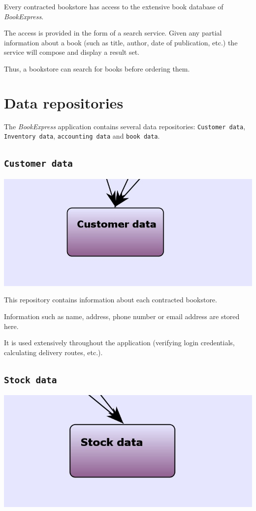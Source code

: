 Every contracted bookstore has access to the extensive book database of \emph{BookExpress}.

The access is provided in the form of a search service. Given any partial information about a book (such as title, author, date of publication, etc.)
the service will compose and display a result set.

Thus, a bookstore can search for books before ordering them.



\chapter{Data repositories}
The \emph{BookExpress} application contains several data repositories: \texttt{Customer data}, \texttt{Inventory data}, \texttt{accounting data} and \texttt{book data}.


\section{\texttt{Customer data}}

\includegraphics[scale=0.8]{screenshots/Customer_data.jpeg}

This repository contains information about each contracted bookstore.

Information such as name, address, phone number or email address are stored here.

It is used extensively throughout the application (verifying login credentials, calculating delivery routes, etc.).


\section{\texttt{Stock data}}

\includegraphics[scale=0.8]{screenshots/Stock_data.jpeg}

